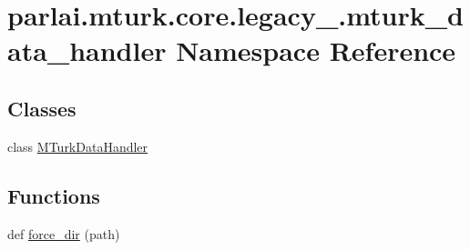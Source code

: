 \hypertarget{namespaceparlai_1_1mturk_1_1core_1_1legacy__2018_1_1mturk__data__handler}{}\section{parlai.\+mturk.\+core.\+legacy\+\_.\+mturk\+\_\+data\+\_\+handler Namespace Reference}
\label{namespaceparlai_1_1mturk_1_1core_1_1legacy__2018_1_1mturk__data__handler}
\subsection*{Classes}
\begin{DoxyCompactItemize}
\item 
class \hyperlink{classparlai_1_1mturk_1_1core_1_1legacy__2018_1_1mturk__data__handler_1_1MTurkDataHandler}{M\+Turk\+Data\+Handler}
\end{DoxyCompactItemize}
\subsection*{Functions}
\begin{DoxyCompactItemize}
\item 
def \hyperlink{namespaceparlai_1_1mturk_1_1core_1_1legacy__2018_1_1mturk__data__handler_af046a82aca024a0c9a5e1b30a10fd921}{force\+\_\+dir} (path)
\end{DoxyCompactItemize}

